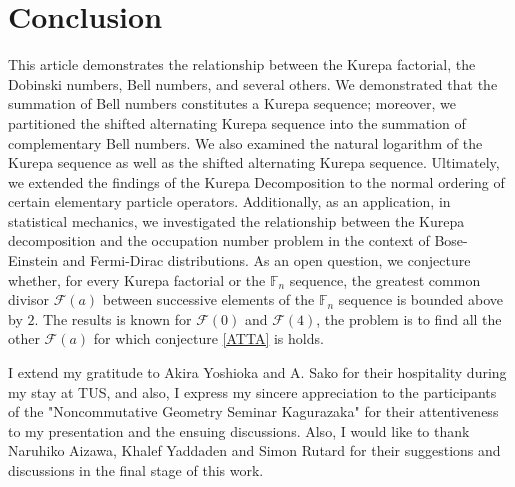 \documentclass[pdflatex,sn-mathphys-num]{sn-jnl}%
\theoremstyle{thmstyleone}%
\theoremstyle{thmstyletwo}%
\theoremstyle{thmstylethree}%
\begin{document}
\section{Conclusion}\label{Conclus}
This article demonstrates the relationship between the Kurepa factorial, the Dobinski numbers, Bell numbers, and several others. We demonstrated that the summation of Bell numbers constitutes a Kurepa sequence; moreover, we partitioned the shifted alternating Kurepa sequence into the summation of complementary Bell numbers. We also examined the natural logarithm of the Kurepa sequence as well as the shifted alternating Kurepa sequence. Ultimately, we extended the findings of the Kurepa Decomposition to the normal ordering of certain elementary particle operators. Additionally, as an application, in statistical mechanics, we investigated the relationship between the Kurepa decomposition and the occupation number problem in the context of Bose-Einstein and Fermi-Dirac distributions. As an open question, we conjecture whether, for every Kurepa factorial or the $\mathbb{F}_n$ sequence, the greatest common divisor $\mathcal{F}(a)$ between successive elements of the $\mathbb{F}_n$ sequence is bounded above by $2$. The results is known for $\mathcal{F}(0)$ and $\mathcal{F}(4)$, the problem is to find all the other $\mathcal{F}(a)$ for which conjecture \ref{ATTA} is holds.


I extend my gratitude to Akira Yoshioka and A. Sako for their hospitality during my stay at TUS, and also, I express my sincere appreciation to the participants of the "Noncommutative Geometry Seminar Kagurazaka" for their attentiveness to my presentation and the ensuing discussions. Also, I would like to thank Naruhiko Aizawa, Khalef Yaddaden and Simon Rutard for their suggestions and discussions in the final stage of this work.
\end{document}
